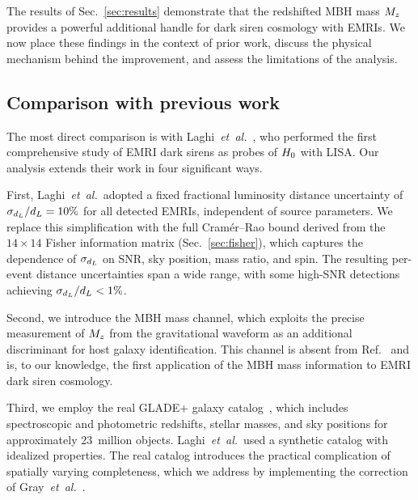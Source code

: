 
The results of Sec.~\ref{sec:results} demonstrate that the redshifted MBH
mass $M_z$ provides a powerful additional handle for dark siren cosmology
with EMRIs.  We now place these findings in the context of prior work,
discuss the physical mechanism behind the improvement, and assess the
limitations of the analysis.

\subsection{Comparison with previous work}
\label{sec:comparison}

The most direct comparison is with
Laghi~\emph{et~al.}~\cite{Laghi:2021pqk}, who performed the first
comprehensive study of EMRI dark sirens as probes of $H_0$ with LISA.
Our analysis extends their work in four significant ways.

First, Laghi~\emph{et~al.}\ adopted a fixed fractional luminosity
distance uncertainty of $\sigma_{d_L}/d_L = 10\%$ for all detected
EMRIs, independent of source parameters.  We replace this simplification
with the full Cram\'{e}r--Rao bound derived from the $14 \times 14$
Fisher information matrix (Sec.~\ref{sec:fisher}), which captures the
dependence of $\sigma_{d_L}$ on SNR, sky position, mass ratio, and spin.
The resulting per-event distance uncertainties span a wide range, with
some high-SNR detections achieving $\sigma_{d_L}/d_L < 1\%$.

Second, we introduce the MBH mass channel, which exploits the precise
measurement of $M_z$ from the gravitational waveform as an additional
discriminant for host galaxy identification.  This channel is absent from
Ref.~\cite{Laghi:2021pqk} and is, to our knowledge, the first
application of the MBH mass information to EMRI dark siren cosmology.

Third, we employ the real GLADE+ galaxy catalog~\cite{Dalya:2021ewn},
which includes spectroscopic and photometric redshifts, stellar masses,
and sky positions for approximately 23~million objects.
Laghi~\emph{et~al.}\ used a synthetic catalog with idealized properties.
The real catalog introduces the practical complication of spatially
varying completeness, which we address by implementing the correction of
Gray~\emph{et~al.}~\cite{Gray:2019ksv}.

